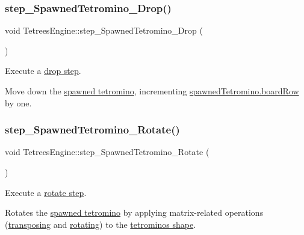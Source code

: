 \subsubsection{\texorpdfstring{step\+\_\+\+Spawned\+Tetromino\+\_\+\+Drop()}{step\_SpawnedTetromino\_Drop()}}
{\footnotesize\ttfamily void Tetrees\+Engine\+::step\+\_\+\+Spawned\+Tetromino\+\_\+\+Drop (\begin{DoxyParamCaption}{ }\end{DoxyParamCaption})\hspace{0.3cm}{\ttfamily [private]}}



Execute a \hyperlink{TetreesDefs_8hpp_a4d5a793092a473f85b4c1f7faf62afeda6df5f4c213c30a4ad91af7a5d10daa8e}{drop step}. 

Move down the \hyperlink{classTetreesEngine_a26435ee2f02d9ba70d9e359745114f6e}{spawned tetromino}, incrementing \hyperlink{structpiece__t}{spawned\+Tetromino.board\+Row} by one. \mbox{\label{classTetreesEngine_a90d1d65e12fb37850962305d8bc3b7a3}} 
\subsubsection{\texorpdfstring{step\+\_\+\+Spawned\+Tetromino\+\_\+\+Rotate()}{step\_SpawnedTetromino\_Rotate()}}
{\footnotesize\ttfamily void Tetrees\+Engine\+::step\+\_\+\+Spawned\+Tetromino\+\_\+\+Rotate (\begin{DoxyParamCaption}{ }\end{DoxyParamCaption})\hspace{0.3cm}{\ttfamily [private]}}



Execute a \hyperlink{TetreesDefs_8hpp_a4d5a793092a473f85b4c1f7faf62afeda22387bf41fe41a5ac2b7b74ab8f5c342}{rotate step}. 

Rotates the \hyperlink{classTetreesEngine_a26435ee2f02d9ba70d9e359745114f6e}{spawned tetromino} by applying matrix-\/related operations (\hyperlink{classMatrix2D_a788abe5e1fbd6a1fbd0d445aca4f8300}{transposing} and \hyperlink{classMatrix2D_a2845ff86d7f24ccd338b42b2a9cbe017}{rotating}) to the \hyperlink{structpiece__t_a3c8f9c2e51c6bab728e564143c439746}{tetromino\textquotesingle{}s shape}. \mbox{\label{classTetreesEngine_ab7169a28a06a867ada69a01a580fb2ad}} 

